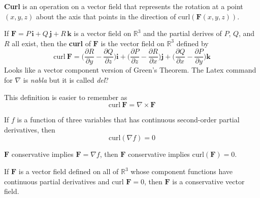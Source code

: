 \documentclass[../main.tex]{subfiles}
\begin{document}
\textbf{Curl} is an operation on a vector field that represents the rotation at a point $(x,y,z)$ about the axis that points in the direction of curl$(\textbf{F}(x,y,z))$.

\begin{definition}[Curl]
If $\textbf{F} = P\,\textbf{i} + Q\,\textbf{j} + R\,\textbf{k}$ is a vector field on $\mathbb{R}^3$ and the partial derives of $P$, $Q$, and $R$ all exist, then the \textbf{curl} of $\textbf{F}$ is the vector field on $\mathbb{R}^3$ defined by
\begin{equation*}
\text{curl}\ \textbf{F} = \Big( \frac{\partial R}{\partial y} - \frac{\partial Q}{\partial z}\Big)\textbf{i}+\Big( \frac{\partial P}{\partial z} - \frac{\partial R}{\partial x}\Big)\textbf{j}+\Big( \frac{\partial Q}{\partial x} - \frac{\partial P}{\partial y}\Big)\textbf{k}
\end{equation*}
\color{red} Looks like a vector component version of Green's Theorem. The Latex command for $\nabla$ is \textit{nabla} but it is called \textit{del}?\color{black}
\end{definition}
This definition is easier to remember as
\begin{equation*}
\text{curl}\ \textbf{F} = \nabla \times \textbf{F}
\end{equation*}
\begin{theorem}
If $f$ is a function of three variables that has continuous second-order partial derivatives, then
\begin{equation}
\text{curl}(\nabla f) = 0
\end{equation}
\end{theorem}
\noindent$\textbf{F}$ conservative implies $\textbf{F}=\nabla f$, then $\textbf{F}$ conservative implies curl$(\textbf{F}) = 0$.
\begin{theorem}
If $\textbf{F}$ is a vector field defined on all of $\mathbb{R}^3$ whose component functions have continuous partial derivatives and curl $\textbf{F} = 0$, then $\textbf{F}$ is a conservative vector field.
\end{theorem}
\end{document}
